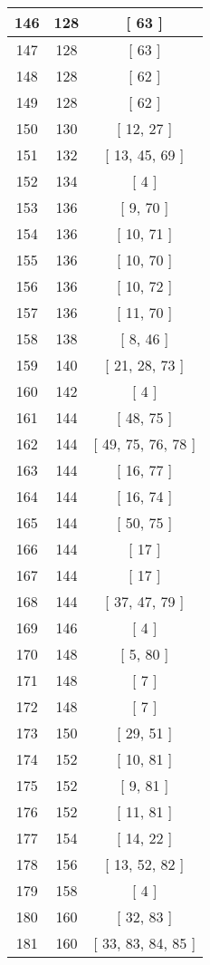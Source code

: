 \begin{center}
\begin{longtable}[H]{|| c c c ||}
\hline
146 & 128 & [ 63 ] \\ 
\hline
147 & 128 & [ 63 ] \\ 
\hline
148 & 128 & [ 62 ] \\ 
\hline
149 & 128 & [ 62 ] \\ 
\hline
150 & 130 & [ 12, 27 ] \\ 
\hline
151 & 132 & [ 13, 45, 69 ] \\ 
\hline
152 & 134 & [ 4 ] \\ 
\hline
153 & 136 & [ 9, 70 ] \\ 
\hline
154 & 136 & [ 10, 71 ] \\ 
\hline
155 & 136 & [ 10, 70 ] \\ 
\hline
156 & 136 & [ 10, 72 ] \\ 
\hline
157 & 136 & [ 11, 70 ] \\ 
\hline
158 & 138 & [ 8, 46 ] \\ 
\hline
159 & 140 & [ 21, 28, 73 ] \\ 
\hline
160 & 142 & [ 4 ] \\ 
\hline
161 & 144 & [ 48, 75 ] \\ 
\hline
162 & 144 & [ 49, 75, 76, 78 ] \\ 
\hline
163 & 144 & [ 16, 77 ] \\ 
\hline
164 & 144 & [ 16, 74 ] \\ 
\hline
165 & 144 & [ 50, 75 ] \\ 
\hline
166 & 144 & [ 17 ] \\ 
\hline
167 & 144 & [ 17 ] \\ 
\hline
168 & 144 & [ 37, 47, 79 ] \\ 
\hline
169 & 146 & [ 4 ] \\ 
\hline
170 & 148 & [ 5, 80 ] \\ 
\hline
171 & 148 & [ 7 ] \\ 
\hline
172 & 148 & [ 7 ] \\ 
\hline
173 & 150 & [ 29, 51 ] \\ 
\hline
174 & 152 & [ 10, 81 ] \\ 
\hline
175 & 152 & [ 9, 81 ] \\ 
\hline
176 & 152 & [ 11, 81 ] \\ 
\hline
177 & 154 & [ 14, 22 ] \\ 
\hline
178 & 156 & [ 13, 52, 82 ] \\ 
\hline
179 & 158 & [ 4 ] \\ 
\hline
180 & 160 & [ 32, 83 ] \\ 
\hline
181 & 160 & [ 33, 83, 84, 85 ] \\ 

\end{longtable}
\end{center}
